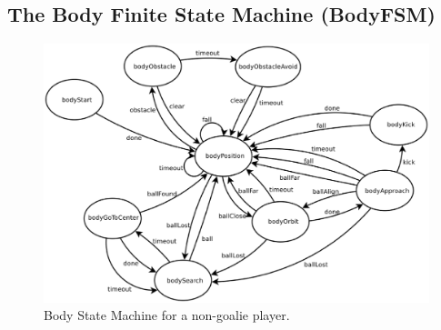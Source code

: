 \documentclass{article}
\begin{document}
	\subsection{The Body Finite State Machine (BodyFSM)}
		\begin{figure}[H]
			\centering
			\includegraphics[width=\textwidth]{figures/BodyFSM.eps}
			\caption{Body State Machine for a non-goalie player.}
			\label{fig:bodyfsm}
		\end{figure}
		
\end{document}

